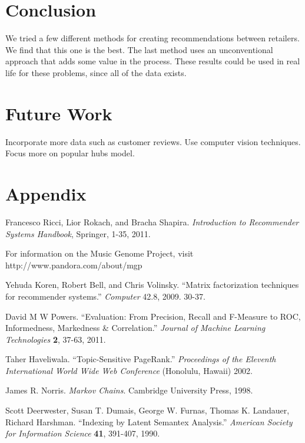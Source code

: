\documentclass[11pt]{article}
\begin{document}
\section*{Conclusion}
We tried a few different methods for creating recommendations between
retailers. We find that this one is the best.
The last method uses an unconventional approach that adds some value in the
process. These results could be used in real life for these problems, since all
of the data exists.

\section*{Future Work}
Incorporate more data such as customer reviews. Use computer vision techniques.
Focus more on popular hubs model.

\section*{Appendix}

\begin{thebibliography}{9}

    Francesco Ricci, Lior Rokach, and Bracha Shapira.
    \emph{Introduction to Recommender Systems Handbook}, Springer, 1-35, 2011.

    For information on the Music Genome Project, visit
    http://www.pandora.com/about/mgp

    Yehuda Koren, Robert Bell, and Chris Volinsky.
    ``Matrix factorization techniques for recommender systems.''
    \emph{Computer} 42.8, 2009. 30-37.

    David M W Powers.
    ``Evaluation: From Precision, Recall and F-Measure to ROC, Informedness,
Markedness \& Correlation.''
    \emph{Journal of Machine Learning Technologies} \textbf{2}, 37-63, 2011.

    Taher Haveliwala.
    ``Topic-Sensitive PageRank.''
    \emph{Proceedings of the Eleventh International World Wide Web Conference}
(Honolulu, Hawaii) 2002.

    James R. Norris.
    \emph{Markov Chains}. Cambridge University Press, 1998.

    Scott Deerwester, Susan T. Dumais, George W. Furnas, Thomas K. Landauer,
Richard Harshman.
    ``Indexing by Latent Semantex Analysis.''
    \emph{American Society for Information Science} \textbf{41}, 391-407, 1990.

\end{thebibliography}
\end{document}
